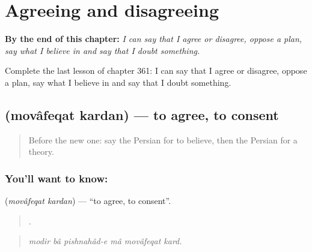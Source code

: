 
\chapter{Agreeing and disagreeing}
\label{ch:fa-agreeing-and-disagreeing}

\begin{chapteropening}
\textbf{By the end of this chapter:} \emph{I can say that I agree or disagree, oppose a plan, say what I believe in and say that I doubt something.}

Complete the last lesson of chapter 361: I can say that I agree or disagree, oppose a plan, say what I believe in and say that I doubt something.
\end{chapteropening}

\section[\texorpdfstring{\fa{موافقت} \fa{کردن} (movâfeqat kardan)}{موافقت کردن (movâfeqat kardan)}]{  (movâfeqat kardan) — to agree, to consent}

\label{lesson:FA-C361-movafeqat-kardan}



\begin{quote}
Before the new one: say the Persian for to believe, then the Persian for a theory.
\end{quote}

\subsection*{You'll want to know:  }
\textbf{ } (\emph{movâfeqat kardan}) — \textquotedblleft{}to agree, to consent\textquotedblright{}.

\begin{quote}
     .
\end{quote}

\begin{quote}
\emph{modir bâ pishnahâd-e mâ movâfeqat kard.}
\end{quote}

